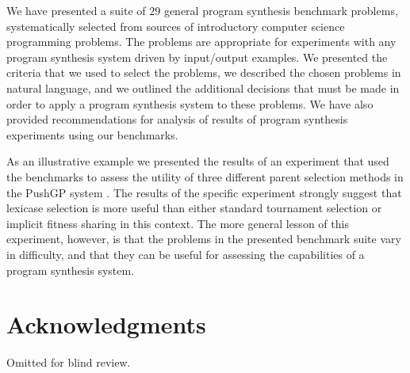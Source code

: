 \documentclass{sig-alternate}
\begin{document}
We have presented a suite of $29$ general program synthesis benchmark problems, systematically selected from sources of introductory computer science programming problems. 
The problems are appropriate for experiments with any program synthesis system driven by input/output examples. 
We presented the criteria that we used to select the problems, we described the chosen problems in natural language, and we outlined the additional decisions that must be made in order to apply a program synthesis system to these problems. We have also provided recommendations for analysis of results of program synthesis experiments using our benchmarks. 

As an illustrative example we presented the results of an experiment that used the benchmarks to assess the utility of three different parent selection methods in the PushGP system \cite{spector:2002:GPEM, 1068292}. The results of the specific experiment strongly suggest that lexicase selection \cite{Helmuth:2014:ieeeTEC} is more useful than either standard tournament selection or implicit fitness sharing \cite{McKay:2000:GECCO,Krawiec:2013:EvoIASP} in this context. The more general lesson of this experiment, however, is that the problems in the presented benchmark suite vary in difficulty, and that they can be useful for assessing the capabilities of a program synthesis system.


\section{Acknowledgments}
Omitted for blind review.
\end{document}
